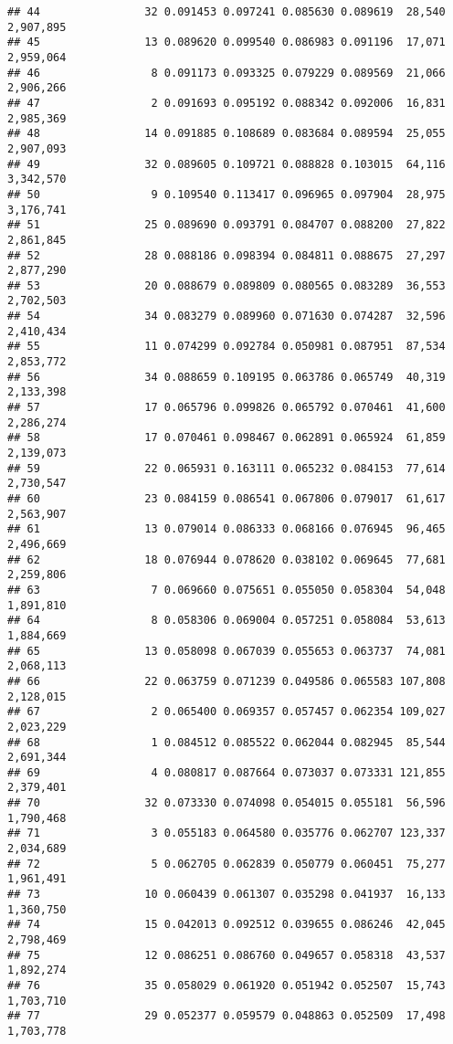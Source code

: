 \documentclass[]{article}
\begin{document}
\begin{verbatim}
## 44                32 0.091453 0.097241 0.085630 0.089619  28,540 2,907,895
## 45                13 0.089620 0.099540 0.086983 0.091196  17,071 2,959,064
## 46                 8 0.091173 0.093325 0.079229 0.089569  21,066 2,906,266
## 47                 2 0.091693 0.095192 0.088342 0.092006  16,831 2,985,369
## 48                14 0.091885 0.108689 0.083684 0.089594  25,055 2,907,093
## 49                32 0.089605 0.109721 0.088828 0.103015  64,116 3,342,570
## 50                 9 0.109540 0.113417 0.096965 0.097904  28,975 3,176,741
## 51                25 0.089690 0.093791 0.084707 0.088200  27,822 2,861,845
## 52                28 0.088186 0.098394 0.084811 0.088675  27,297 2,877,290
## 53                20 0.088679 0.089809 0.080565 0.083289  36,553 2,702,503
## 54                34 0.083279 0.089960 0.071630 0.074287  32,596 2,410,434
## 55                11 0.074299 0.092784 0.050981 0.087951  87,534 2,853,772
## 56                34 0.088659 0.109195 0.063786 0.065749  40,319 2,133,398
## 57                17 0.065796 0.099826 0.065792 0.070461  41,600 2,286,274
## 58                17 0.070461 0.098467 0.062891 0.065924  61,859 2,139,073
## 59                22 0.065931 0.163111 0.065232 0.084153  77,614 2,730,547
## 60                23 0.084159 0.086541 0.067806 0.079017  61,617 2,563,907
## 61                13 0.079014 0.086333 0.068166 0.076945  96,465 2,496,669
## 62                18 0.076944 0.078620 0.038102 0.069645  77,681 2,259,806
## 63                 7 0.069660 0.075651 0.055050 0.058304  54,048 1,891,810
## 64                 8 0.058306 0.069004 0.057251 0.058084  53,613 1,884,669
## 65                13 0.058098 0.067039 0.055653 0.063737  74,081 2,068,113
## 66                22 0.063759 0.071239 0.049586 0.065583 107,808 2,128,015
## 67                 2 0.065400 0.069357 0.057457 0.062354 109,027 2,023,229
## 68                 1 0.084512 0.085522 0.062044 0.082945  85,544 2,691,344
## 69                 4 0.080817 0.087664 0.073037 0.073331 121,855 2,379,401
## 70                32 0.073330 0.074098 0.054015 0.055181  56,596 1,790,468
## 71                 3 0.055183 0.064580 0.035776 0.062707 123,337 2,034,689
## 72                 5 0.062705 0.062839 0.050779 0.060451  75,277 1,961,491
## 73                10 0.060439 0.061307 0.035298 0.041937  16,133 1,360,750
## 74                15 0.042013 0.092512 0.039655 0.086246  42,045 2,798,469
## 75                12 0.086251 0.086760 0.049657 0.058318  43,537 1,892,274
## 76                35 0.058029 0.061920 0.051942 0.052507  15,743 1,703,710
## 77                29 0.052377 0.059579 0.048863 0.052509  17,498 1,703,778

\end{verbatim}
\end{document}
